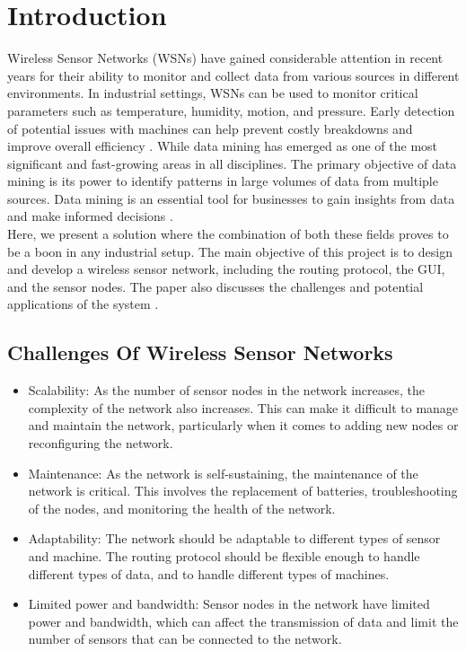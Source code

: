 \documentclass[conference]{IEEEtran}
\begin{document}
\section{Introduction}
Wireless Sensor Networks (WSNs) have gained considerable attention in recent years for their ability to monitor and collect data from various sources in different environments. In industrial settings, WSNs can be used to monitor critical parameters such as temperature, humidity, motion, and pressure. Early detection of potential issues with machines can help prevent costly breakdowns and improve overall efficiency \cite{b1}. While data mining has emerged as one of the most significant and fast-growing areas in all disciplines. The primary objective of data mining is its power to identify patterns in large volumes of data from multiple sources. Data mining is an essential tool for businesses to gain insights from data and make informed decisions \cite{b2}.\\ 
Here, we present a solution where the combination of both these fields proves to be a boon in any industrial setup.
The main objective of this project is to design and develop a wireless sensor network, including the routing protocol, the GUI, and the sensor nodes. The paper also discusses the challenges and potential applications of the system \cite{b3}.


\subsection{Challenges Of Wireless Sensor Networks}\label{AA}
\begin{itemize}
    \item Scalability: As the number of sensor nodes in the network increases, the complexity of the network also increases. This can make it difficult to manage and maintain the network, particularly when it comes to adding new nodes or reconfiguring the network.
    \item Maintenance: As the network is self-sustaining, the maintenance of the network is critical. This involves the replacement of batteries, troubleshooting of the nodes, and monitoring the health of the network.
    \item Adaptability: The network should be adaptable to different types of sensor and machine. The routing protocol should be flexible enough to handle different types of data, and to handle different types of machines.
    \item Limited power and bandwidth: Sensor nodes in the network have limited power and bandwidth, which can affect the transmission of data and limit the number of sensors that can be connected to the network.
\end{itemize}
\end{document}
